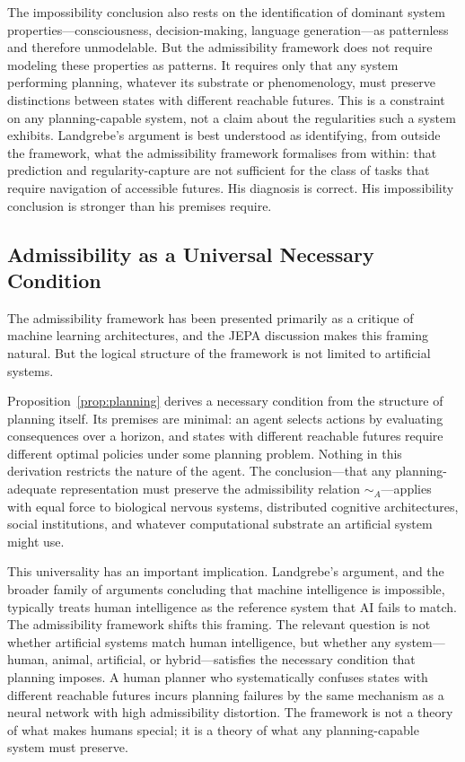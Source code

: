\documentclass[11pt, a4paper]{article}
\theoremstyle{plain}
\theoremstyle{definition}
\theoremstyle{remark}
\newcommand{\simA}{\sim_A}
\begin{document}
The impossibility conclusion also rests on the identification of dominant system properties---consciousness, decision-making, language generation---as patternless and therefore unmodelable. But the admissibility framework does not require modeling these properties as patterns. It requires only that any system performing planning, whatever its substrate or phenomenology, must preserve distinctions between states with different reachable futures. This is a constraint on any planning-capable system, not a claim about the regularities such a system exhibits. Landgrebe's argument is best understood as identifying, from outside the framework, what the admissibility framework formalises from within: that prediction and regularity-capture are not sufficient for the class of tasks that require navigation of accessible futures. His diagnosis is correct. His impossibility conclusion is stronger than his premises require.

\subsection{Admissibility as a Universal Necessary Condition}

The admissibility framework has been presented primarily as a critique of machine learning architectures, and the JEPA discussion makes this framing natural. But the logical structure of the framework is not limited to artificial systems.

Proposition~\ref{prop:planning} derives a necessary condition from the structure of planning itself. Its premises are minimal: an agent selects actions by evaluating consequences over a horizon, and states with different reachable futures require different optimal policies under some planning problem. Nothing in this derivation restricts the nature of the agent. The conclusion---that any planning-adequate representation must preserve the admissibility relation $\simA$---applies with equal force to biological nervous systems, distributed cognitive architectures, social institutions, and whatever computational substrate an artificial system might use.

This universality has an important implication. Landgrebe's argument, and the broader family of arguments concluding that machine intelligence is impossible, typically treats human intelligence as the reference system that AI fails to match. The admissibility framework shifts this framing. The relevant question is not whether artificial systems match human intelligence, but whether any system---human, animal, artificial, or hybrid---satisfies the necessary condition that planning imposes. A human planner who systematically confuses states with different reachable futures incurs planning failures by the same mechanism as a neural network with high admissibility distortion. The framework is not a theory of what makes humans special; it is a theory of what any planning-capable system must preserve.
\end{document}

